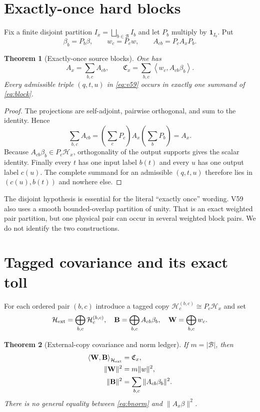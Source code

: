 \documentclass[11pt]{article}
\newtheorem{theorem}{Theorem}
\newcommand{\ip}[2]{\left\langle #1,#2\right\rangle}
\newcommand{\Cx}{\mathfrak C_x}
\begin{document}
\section{Exactly-once hard blocks}

Fix a finite disjoint partition $I_x=\bigsqcup_{b\in\mathcal B}I_b$ and let
$P_b$ multiply by $\mathbf1_{I_b}$.  Put
\[
 \beta_b=P_b\beta,\qquad w_c=P_cw,\qquad A_{cb}=P_cA_xP_b.
\]

\begin{theorem}[Exactly-once source blocks]\label{thm:block}
One has
\begin{equation}
 A_x=\sum_{b,c}A_{cb},\qquad
 \Cx=\sum_{b,c}\ip{w_c}{A_{cb}\beta_b}.              \label{eq:block}
\end{equation}
Every admissible triple $(q,t,u)$ in \eqref{eq:v59} occurs in exactly one
summand of \eqref{eq:block}.
\end{theorem}

\begin{proof}
The projections are self-adjoint, pairwise orthogonal, and sum to the
identity.  Hence
\[
 \sum_{b,c}A_{cb}=\left(\sum_cP_c\right)A_x
                    \left(\sum_bP_b\right)=A_x.
\]
Because $A_{cb}\beta_b\in P_c\mathcal H_x$, orthogonality of the output
supports gives the scalar identity.  Finally every $t$ has one input label
$b(t)$ and every $u$ has one output label $c(u)$.  The complete summand for an
admissible $(q,t,u)$ therefore lies in $(c(u),b(t))$ and nowhere else.
\end{proof}

The disjoint hypothesis is essential for the literal ``exactly once''
wording.  V59 also uses a smooth bounded-overlap partition of unity.  That is
an exact weighted pair partition, but one physical pair can occur in several
weighted block pairs.  We do not identify the two constructions.

\section{Tagged covariance and its exact toll}

For each ordered pair $(b,c)$ introduce a tagged copy
$\mathcal H_c^{(b,c)}\cong P_c\mathcal H_x$ and set
\[
 \mathcal H_{\rm ext}=\bigoplus_{b,c}\mathcal H_c^{(b,c)},\quad
 \mathbf B=\bigoplus_{b,c}A_{cb}\beta_b,\quad
 \mathbf W=\bigoplus_{b,c}w_c.
\]

\begin{theorem}[External-copy covariance and norm ledger]\label{thm:norm}
If $m=|\mathcal B|$, then
\begin{align}
 \ip{\mathbf W}{\mathbf B}_{\mathcal H_{\rm ext}}&=\Cx,\label{eq:cov}\\
 \|\mathbf W\|^2&=m\|w\|^2,\label{eq:wnorm}\\
 \|\mathbf B\|^2&=\sum_{b,c}\|A_{cb}\beta_b\|^2.\label{eq:bnorm}
\end{align}
There is no general equality between \eqref{eq:bnorm} and
$\|A_x\beta\|^2$.
\end{theorem}
\end{document}
